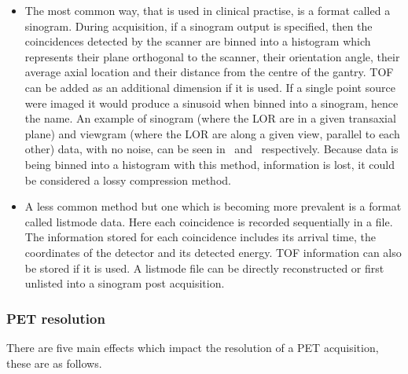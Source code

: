                 \begin{itemize}
                    \item The most common way, that is used in clinical practise, is a format called a sinogram. During acquisition, if a sinogram output is specified, then the coincidences detected by the scanner are binned into a histogram which represents their plane orthogonal to the scanner, their orientation angle, their average axial location and their distance from the centre of the gantry. \gls{TOF} can be added as an additional dimension if it is used. %
                    If a single point source were imaged it would produce a sinusoid when binned into a sinogram, hence the name. An example of sinogram (where the \gls{LOR} are in a given transaxial plane) and viewgram (where the \gls{LOR} are along a given view, parallel to each other) data, with no noise, can be seen in~ and~ respectively. Because data is being binned into a histogram with this method, information is lost, it could be considered a lossy compression method.
                    
                    \item A less common method but one which is becoming more prevalent is a format called listmode data. Here each coincidence is recorded sequentially in a file. The information stored for each coincidence includes its arrival time, the coordinates of the detector and its detected energy. \gls{TOF} information can also be stored if it is used. %
                    A listmode file can be directly reconstructed or first unlisted into a sinogram post acquisition. %
                \end{itemize}
            
            \subsubsection{PET resolution} \label{sec:pet_resolution}
                There are five main effects which impact the resolution of a \gls{PET} acquisition, these are as follows.
                
